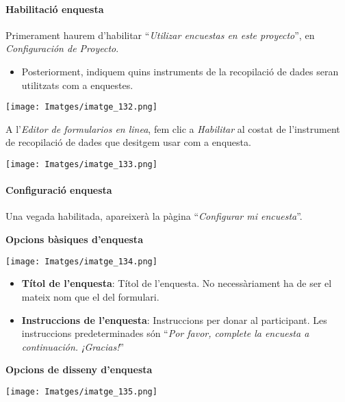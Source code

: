 \documentclass[
]{article}
\providecommand{\tightlist}{%
  \setlength{\itemsep}{0pt}\setlength{\parskip}{0pt}}
\begin{document}
\hypertarget{habilitaciuxf3-enquesta}{%
\paragraph{Habilitació enquesta}\label{habilitaciuxf3-enquesta}}

Primerament haurem d'habilitar ``\emph{Utilizar encuestas en este proyecto}'', en \emph{Configuración de Proyecto}.

\begin{itemize}
\tightlist
\item
  Posteriorment, indiquem quins instruments de la recopilació de dades seran utilitzats com a enquestes.
\end{itemize}

\texttt{[image: Imatges/imatge\_132.png]}

A l'\emph{Editor de formularios en linea}, fem clic a \emph{Habilitar} al costat de l'instrument de recopilació de dades que desitgem usar com a enquesta.

\texttt{[image: Imatges/imatge\_133.png]}

\hypertarget{configuraciuxf3-enquesta}{%
\paragraph{\texorpdfstring{\textbf{Configuració enquesta}}{Configuració enquesta}}\label{configuraciuxf3-enquesta}}

Una vegada habilitada, apareixerà la pàgina ``\emph{Configurar mi encuesta}''.

\textbf{Opcions bàsiques d'enquesta}

\texttt{[image: Imatges/imatge\_134.png]}

\begin{itemize}
\tightlist
\item
  \textbf{Títol de l'enquesta}: Títol de l'enquesta. No necessàriament ha de ser el mateix nom que el del formulari.
\item
  \textbf{Instruccions de l'enquesta}: Instruccions per donar al participant. Les instruccions predeterminades són ``\emph{Por favor, complete la encuesta a continuación. ¡Gracias!}''
\end{itemize}

\textbf{Opcions de disseny d'enquesta}

\texttt{[image: Imatges/imatge\_135.png]}
\end{document}
